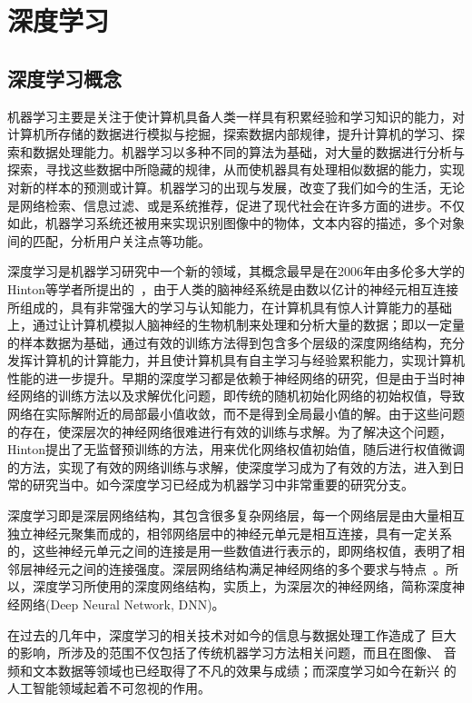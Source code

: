 \chapter{深度学习}
\label{dl}

\section{深度学习概念}


机器学习主要是关注于使计算机具备人类一样具有积累经验和学习知识的能力，对计算机所存储的数据进行模拟与挖掘，探索数据内部规律，提升计算机的学习、探索和数据处理能力。机器学习以多种不同的算法为基础，对大量的数据进行分析与探索，寻找这些数据中所隐藏的规律，从而使机器具有处理相似数据的能力，实现对新的样本的预测或计算。机器学习的出现与发展，改变了我们如今的生活，无论是网络检索、信息过滤、或是系统推荐，促进了现代社会在许多方面的进步。不仅如此，机器学习系统还被用来实现识别图像中的物体，文本内容的描述，多个对象间的匹配，分析用户关注点等功能。

深度学习是机器学习研究中一个新的领域，其概念最早是在2006年由多伦多大学的Hinton等学者所提出的~\cite{hinton2006fast}，由于人类的脑神经系统是由数以亿计的神经元相互连接所组成的，具有非常强大的学习与认知能力，在计算机具有惊人计算能力的基础上，通过让计算机模拟人脑神经的生物机制来处理和分析大量的数据；即以一定量的样本数据为基础，通过有效的训练方法得到包含多个层级的深度网络结构，充分发挥计算机的计算能力，并且使计算机具有自主学习与经验累积能力，实现计算机性能的进一步提升。早期的深度学习都是依赖于神经网络的研究，但是由于当时神经网络的训练方法以及求解优化问题，即传统的随机初始化网络的初始权值，导致网络在实际解附近的局部最小值收敛，而不是得到全局最小值的解。由于这些问题的存在，使深层次的神经网络很难进行有效的训练与求解。为了解决这个问题，Hinton提出了无监督预训练的方法，用来优化网络权值初始值，随后进行权值微调的方法，实现了有效的网络训练与求解，使深度学习成为了有效的方法，进入到日常的研究当中。如今深度学习已经成为机器学习中非常重要的研究分支。


深度学习即是深层网络结构，其包含很多复杂网络层，每一个网络层是由大量相互独立神经元聚集而成的，相邻网络层中的神经元单元是相互连接，具有一定关系的，这些神经元单元之间的连接是用一些数值进行表示的，即网络权值，表明了相邻层神经元之间的连接强度。深层网络结构满足神经网络的多个要求与特点~\cite{psaltis1988multilayered}。所以，深度学习所使用的深度网络结构，实质上，为深层次的神经网络，简称深度神经网络(Deep Neural Network, DNN)。



在过去的几年中，深度学习的相关技术对如今的信息与数据处理工作造成了 巨大的影响，所涉及的范围不仅包括了传统机器学习方法相关问题，而且在图像、 音频和文本数据等领域也已经取得了不凡的效果与成绩；而深度学习如今在新兴 的人工智能领域起着不可忽视的作用。


